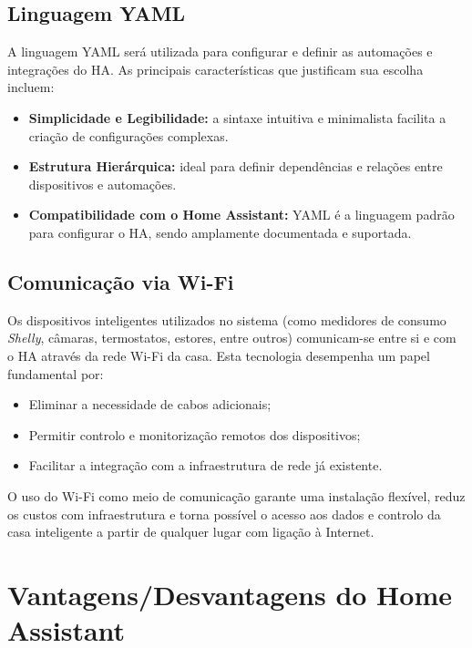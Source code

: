 \subsection*{Linguagem YAML}

A linguagem \gls{YAML} será utilizada para configurar e definir as automações e integrações do \gls{HA}. 
As principais características que justificam sua escolha incluem:

\begin{itemize}
    \item \textbf{Simplicidade e Legibilidade:} a sintaxe intuitiva e minimalista facilita a criação de configurações complexas.
    \item \textbf{Estrutura Hierárquica:} ideal para definir dependências e relações entre dispositivos e automações.
    \item \textbf{Compatibilidade com o Home Assistant:} \gls{YAML} é a linguagem padrão para configurar o \gls{HA}, sendo amplamente documentada e suportada.
\end{itemize}

\subsection*{Comunicação via Wi-Fi}

Os dispositivos inteligentes utilizados no sistema (como medidores de consumo \textit{Shelly}, câmaras, termostatos, estores, entre outros) comunicam-se entre si e com o \gls{HA} através da rede Wi-Fi da casa. Esta tecnologia desempenha um papel fundamental por:

\begin{itemize}
    \item  Eliminar a necessidade de cabos adicionais;
    \item Permitir controlo e monitorização remotos dos dispositivos;
    \item Facilitar a integração com a infraestrutura de rede já existente.
\end{itemize}

O uso do Wi-Fi como meio de comunicação garante uma instalação flexível, reduz os custos com infraestrutura e torna possível o acesso aos dados e controlo da casa inteligente a partir de qualquer lugar com ligação à Internet.

\section{Vantagens/Desvantagens do Home Assistant}

